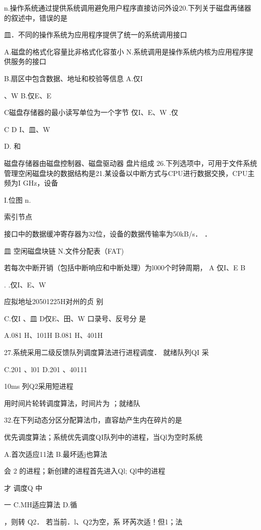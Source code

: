{    n.操作系统通过提供系统调用避免用户程序直接访问外设20.下列关于磁盘再储器的叙述中，错误的是

    皿．不同的操作系统为应用程序提供了统一的系统调用接口

   A.磁盘的格式化容量比非格式化容茧小    N.系统调用是操作系统内核为应用程序提供服务的接口

   B.扇区中包含数据、地址和校验等信息    A.仅I

    、W    B.仅E、E

   C磁盘存储器的最小读写单位为一个字节    仅I、E、W    .仅

    C    D   I、皿、W

   D.    和

    磁盘存储器由磁盘控制器、磁盘驱动器  盘片组成    26.下列选项中，可用于文件系统管理空闲磁盘块的数据结构是21.某设备以中断方式与CPU进行数据交换，CPU主频为I GHz，设备

    I.位图    n.

    索引节点

   接口中的数据缓冲寄存器为32位，设备的数据传输率为50kB/s．    ．

    皿 空闲磁盘块链    N.文件分配表（FAT)

   若每次中断开销（包括中断响应和中断处理）为l000个时钟周期，    A 仅I、E    B

    .    .仅I、E、W

    应拟地址20501225H对州的贞    别

   C.仅I 、皿    D仅E、田、W    口录号、反号分  是

    A.081 H、101H    B.081 H、401H

27.系统采用二级反馈队列调度算法进行进程调度． 就绪队列QI 采

    C.201  、l01     D.201  、40111

    10ms    列Q2采用短进程

   用时间片轮转调度算法，时间片为    ；就绪队

    32.在下列动态分区分配算法巾，直容劫产生内在碎片的是

   优先调度算法；系统优先调度QI队列中的进程，当Ql为空时系统

    A.首次适应11法    B.最坏适j也算法

    会    2  的进程；新创建的进程首先进入Ql; Ql中的进程

   才  调度Q 中

    一    C.MH适应算法    D.循

    ，则转   Q2． 若当前．l、Q2为空，系    环芮次适！但1；法

}
